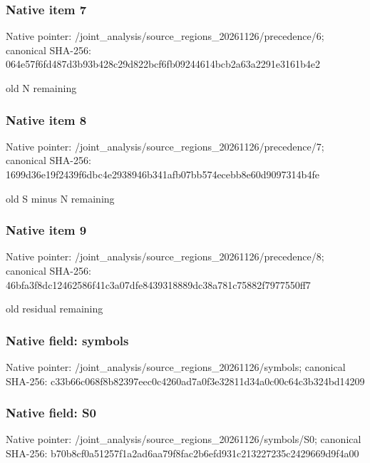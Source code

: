 \documentclass[10pt,a4paper]{article}
\begin{document}
\subsubsection{Native item 7}


Native pointer: /joint\_analysis/source\_r\allowbreak{}egions\_20261126/preceden\allowbreak{}ce/6; canonical SHA-256: 064e57f6fd487d3b93b428c2\allowbreak{}9d822bcf6fb09244614bcb2a\allowbreak{}63a2291e3161b4e2


old N remaining


\subsubsection{Native item 8}


Native pointer: /joint\_analysis/source\_r\allowbreak{}egions\_20261126/preceden\allowbreak{}ce/7; canonical SHA-256: 1699d36e19f2439f6dbc4e29\allowbreak{}38946b341afb07bb574ecebb\allowbreak{}8e60d9097314b4fe


old S minus N remaining


\subsubsection{Native item 9}


Native pointer: /joint\_analysis/source\_r\allowbreak{}egions\_20261126/preceden\allowbreak{}ce/8; canonical SHA-256: 46bfa3f8dc12462586f41c3a\allowbreak{}07dfe8439318889dc38a781c\allowbreak{}75882f7977550ff7


old residual remaining


\subsubsection{Native field: symbols}


Native pointer: /joint\_analysis/source\_r\allowbreak{}egions\_20261126/symbols; canonical SHA-256: c33b66c068f8b82397eec0c4\allowbreak{}260ad7a0f3e32811d34a0c00\allowbreak{}c64c3b324bd14209



\subsubsection{Native field: S0}


Native pointer: /joint\_analysis/source\_r\allowbreak{}egions\_20261126/symbols/\allowbreak{}S0; canonical SHA-256: b70b8cf0a51257f1a2ad6aa7\allowbreak{}9f8fac2b6efd931c21322723\allowbreak{}5c2429669d9f4a00
\end{document}
